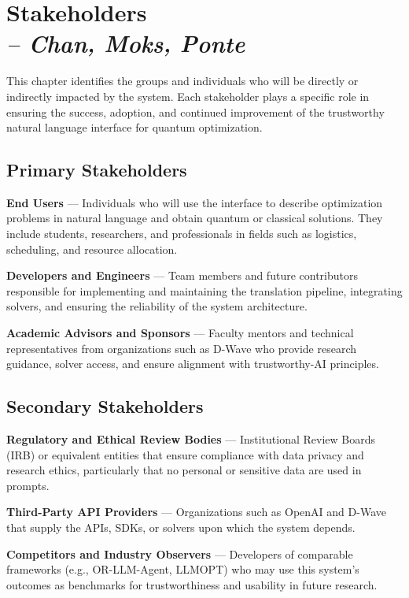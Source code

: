 \chapter{Stakeholders \\
\small{\textit{-- Chan, Moks, Ponte}}
\label{Chapter::Stakeholders}}

This chapter identifies the groups and individuals who will be directly or indirectly impacted by the system. Each stakeholder plays a specific role in ensuring the success, adoption, and continued improvement of the trustworthy natural language interface for quantum optimization.

\section{Primary Stakeholders}

\textbf{End Users} — Individuals who will use the interface to describe optimization problems in natural language and obtain quantum or classical solutions. They include students, researchers, and professionals in fields such as logistics, scheduling, and resource allocation.

\textbf{Developers and Engineers} — Team members and future contributors responsible for implementing and maintaining the translation pipeline, integrating solvers, and ensuring the reliability of the system architecture.

\textbf{Academic Advisors and Sponsors} — Faculty mentors and technical representatives from organizations such as D-Wave who provide research guidance, solver access, and ensure alignment with trustworthy-AI principles.

\section{Secondary Stakeholders}

\textbf{Regulatory and Ethical Review Bodies} — Institutional Review Boards (IRB) or equivalent entities that ensure compliance with data privacy and research ethics, particularly that no personal or sensitive data are used in prompts.

\textbf{Third-Party API Providers} — Organizations such as OpenAI and D-Wave that supply the APIs, SDKs, or solvers upon which the system depends.

\textbf{Competitors and Industry Observers} — Developers of comparable frameworks (e.g., OR-LLM-Agent, LLMOPT) who may use this system’s outcomes as benchmarks for trustworthiness and usability in future research.

